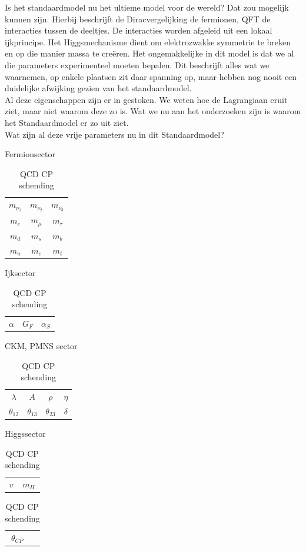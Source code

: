 \documentclass[../main.tex]{subfiles}
\begin{document}
Is het standaardmodel nu het ultieme model voor de wereld? Dat zou mogelijk kunnen zijn. Hierbij beschrijft de Diracvergelijking de fermionen, QFT de interacties tussen de deeltjes. De interacties worden afgeleid uit een lokaal ijkprincipe. Het Higgsmechanisme dient om elektrozwakke symmetrie te breken en op die manier massa te creëren. Het ongemakkelijke in dit model is dat we al die parameters experimenteel moeten bepalen. Dit beschrijft alles wat we waarnemen, op enkele plaatsen zit daar spanning op, maar hebben nog nooit een duidelijke afwijking gezien van het standaardmodel.\\
Al deze eigenschappen zijn er in gestoken. We weten hoe de Lagrangiaan eruit ziet, maar niet waarom deze zo is. Wat we nu aan het onderzoeken zijn is waarom het Standaardmodel er zo uit ziet.\\
Wat zijn al deze vrije parameters nu in dit Standaardmodel?
\begin{table}[h]
    \begin{minipage}[c]{0.48\textwidth}
        \centering
        \caption{Fermionsector}
        \label{tab:fermion_sector_parameters}
        \begin{tabular}{ccc}
            $m_{\nu_{1}}$   & $m_{\nu_{2}}$ & $m_{\nu_{3}}$ \\
            $m_{e}$         & $m_{\mu}$     & $m_{\tau}$ \\
            $m_{d}$         & $m_{s}$       & $m_{b}$ \\
            $m_{u}$         & $m_{c}$       & $m_{t}$
        \end{tabular}
        
        \caption{Ijksector}
        \label{tab:ijk_sector}
        \begin{tabular}{ccc}
            $\alpha$ & $G_F$ & $\alpha_S$
        \end{tabular}
    \end{minipage}
    \begin{minipage}[c]{0.48\textwidth}
        \centering
        \caption{CKM, PMNS sector}
        \label{tab:ckm_pmns_sector}
        \begin{tabular}{cccc}
            $\lambda$       & $A$           & $\rho$        & $\eta$ \\
            $\theta_{12}$   & $\theta_{13}$ & $\theta_{23}$ & $\delta$
        \end{tabular}
        
        \caption{Higgssector}
        \label{tab:higgs_sector}
        \begin{tabular}{cc}
            $v$ & $m_H$
        \end{tabular}

        \caption{QCD CP schending}
        \label{tab:qcd_cp_schending}
        \begin{tabular}{cc}
            $\theta_{CP}$
        \end{tabular}
    \end{minipage}
\end{table}
\end{document}
